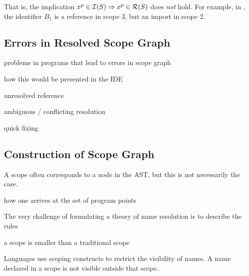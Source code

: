 That is, the implication $x^p \in \mathcal{I}(S)
\Rightarrow x^p \in \mathcal{R}(S)$ does \emph{not} hold. 
For example, in , the identifier $B_1$ is a
reference in scope 3, but an import in scope 2.

\subsection{Errors in Resolved Scope Graph}

\parindent0pt
\baselineskip
{}
	
problems in programs that lead to errors in scope graph

how this would be presented in the IDE

unresolved reference

ambiguous / conflicting resolution

quick fixing




\subsection{Construction of Scope Graph}



A scope often corresponds to a node in the AST, but this is not necessarily the
case. 

how one arrives at the set of program points 

The very challenge of formulating a theory of name resolution is to describe the
rules

a scope is smaller than a traditional scope



Languages use scoping constructs to restrict the visibility of names.
A name declared in a scope is not visible outside that scope.





